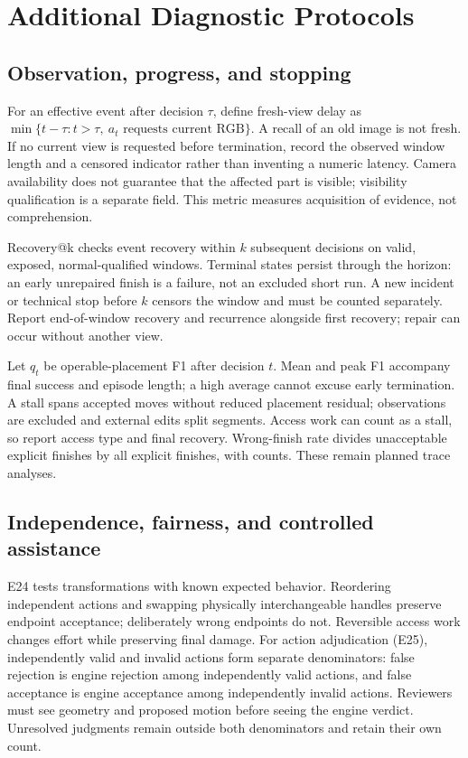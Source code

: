 \documentclass[10pt,twocolumn,letterpaper]{article}
\begin{document}
\section{Additional Diagnostic Protocols}
\subsection{Observation, progress, and stopping}
For an effective event after decision $\tau$, define fresh-view delay as $\min\{t-\tau:t>\tau,\ a_t\text{ requests current RGB}\}$. A recall of an old image is not fresh. If no current view is requested before termination, record the observed window length and a censored indicator rather than inventing a numeric latency. Camera availability does not guarantee that the affected part is visible; visibility qualification is a separate field. This metric measures acquisition of evidence, not comprehension.

Recovery@k checks event recovery within $k$ subsequent decisions on valid, exposed, normal-qualified windows. Terminal states persist through the horizon: an early unrepaired finish is a failure, not an excluded short run. A new incident or technical stop before $k$ censors the window and must be counted separately. Report end-of-window recovery and recurrence alongside first recovery; repair can occur without another view.

Let $q_t$ be operable-placement F1 after decision $t$. Mean and peak F1 accompany final success and episode length; a high average cannot excuse early termination. A stall spans accepted moves without reduced placement residual; observations are excluded and external edits split segments. Access work can count as a stall, so report access type and final recovery. Wrong-finish rate divides unacceptable explicit finishes by all explicit finishes, with counts. These remain planned trace analyses.

\subsection{Independence, fairness, and controlled assistance}
E24 tests transformations with known expected behavior. Reordering independent actions and swapping physically interchangeable handles preserve endpoint acceptance; deliberately wrong endpoints do not. Reversible access work changes effort while preserving final damage. For action adjudication (E25), independently valid and invalid actions form separate denominators: false rejection is engine rejection among independently valid actions, and false acceptance is engine acceptance among independently invalid actions. Reviewers must see geometry and proposed motion before seeing the engine verdict. Unresolved judgments remain outside both denominators and retain their own count.
\end{document}
